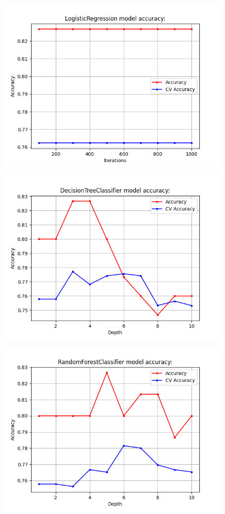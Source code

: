 \documentclass[11pt, a4paper, notitlepage]{report}
\begin{document}
\begin{center}

\includegraphics[width=330pt]{graphics/LogisticRegression_1}

\includegraphics[width=330pt]{graphics/DecisionTreeClassifier_1}

\includegraphics[width=330pt]{graphics/RandomForestClassifier_1}


\end{center}
\end{document}
